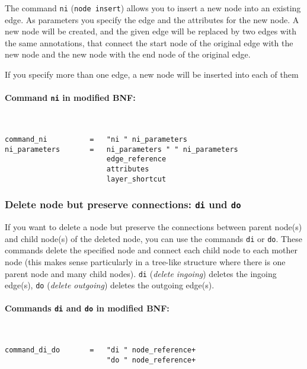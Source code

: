 \documentclass[12pt]{scrartcl}
\begin{document}
The command \texttt{ni} (\texttt{node insert}) allows you to insert a new node into an existing edge.
As parameters you specify the edge and the attributes for the new node.
A new node will be created, and the given edge will be replaced by two edges with the same annotations, that connect the start node of the original edge with the new node and the new node with the end node of the original edge.

If you specify more than one edge, a new node will be inserted into each of them

\paragraph*{Command \texttt{ni} in modified BNF:}
~
\begin{framed}
\begin{lstlisting}
command_ni          =   "ni " ni_parameters
ni_parameters       =   ni_parameters " " ni_parameters
                        edge_reference
                        attributes
                        layer_shortcut
\end{lstlisting}
\end{framed}


\subsubsection{Delete node but preserve connections: \texttt{di} und \texttt{do}}

If you want to delete a node but preserve the connections between parent node(s) and child node(s) of the deleted node, you can use the commands \texttt{di} or \texttt{do}.
These commands delete the specified node and connect each child node to each mother node (this makes sense particularly in a tree-like structure where there is one parent node and many child nodes).
\texttt{di} (\textit{delete ingoing}) deletes the ingoing edge(s), \texttt{do} (\textit{delete outgoing}) deletes the outgoing edge(s).

\paragraph*{Commands \texttt{di} and \texttt{do} in modified BNF:}
~
\begin{framed}
\begin{lstlisting}
command_di_do       =   "di " node_reference+
                        "do " node_reference+
\end{lstlisting}
\end{framed}
\end{document}
